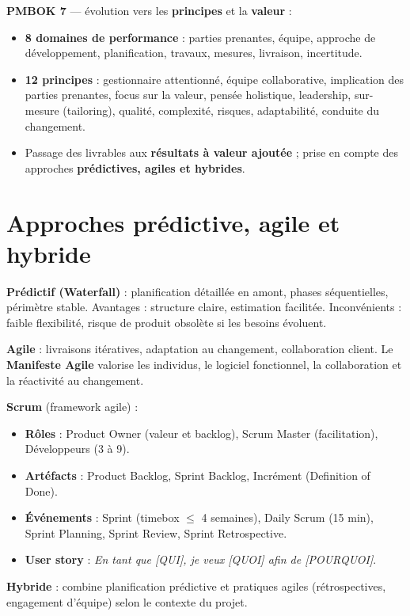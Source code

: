 \documentclass[11pt,a4paper]{article}
\begin{document}
\textbf{PMBOK 7} --- évolution vers les \textbf{principes} et la \textbf{valeur} :
\begin{itemize}
    \item \textbf{8 domaines de performance} : parties prenantes, équipe, approche de développement, planification, travaux, mesures, livraison, incertitude.
    \item \textbf{12 principes} : gestionnaire attentionné, équipe collaborative, implication des parties prenantes, focus sur la valeur, pensée holistique, leadership, sur-mesure (tailoring), qualité, complexité, risques, adaptabilité, conduite du changement.
    \item Passage des livrables aux \textbf{résultats à valeur ajoutée} ; prise en compte des approches \textbf{prédictives, agiles et hybrides}.
\end{itemize}

\section{Approches prédictive, agile et hybride}

\textbf{Prédictif (Waterfall)} : planification détaillée en amont, phases séquentielles, périmètre stable. Avantages : structure claire, estimation facilitée. Inconvénients : faible flexibilité, risque de produit obsolète si les besoins évoluent.

\textbf{Agile} : livraisons itératives, adaptation au changement, collaboration client. Le \textbf{Manifeste Agile} valorise les individus, le logiciel fonctionnel, la collaboration et la réactivité au changement.

\textbf{Scrum} (framework agile) :
\begin{itemize}
    \item \textbf{Rôles} : Product Owner (valeur et backlog), Scrum Master (facilitation), Développeurs (3 à 9).
    \item \textbf{Artéfacts} : Product Backlog, Sprint Backlog, Incrément (Definition of Done).
    \item \textbf{Événements} : Sprint (timebox $\leq$ 4 semaines), Daily Scrum (15 min), Sprint Planning, Sprint Review, Sprint Retrospective.
    \item \textbf{User story} : \textit{En tant que [QUI], je veux [QUOI] afin de [POURQUOI]}.
\end{itemize}

\textbf{Hybride} : combine planification prédictive et pratiques agiles (rétrospectives, engagement d'équipe) selon le contexte du projet.
\end{document}
